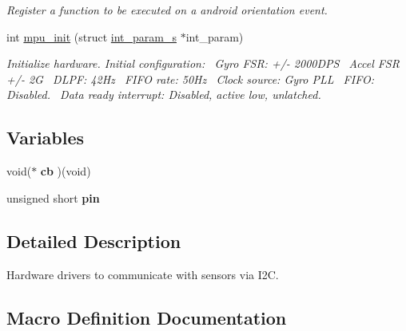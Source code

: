 \begin{DoxyCompactItemize}
\begin{DoxyCompactList}\small\item\em Register a function to be executed on a android orientation event. \end{DoxyCompactList}\item 
int \hyperlink{group___d_r_i_v_e_r_s_ga00895ac6d814fc0441118042d376aa0f}{mpu\+\_\+init} (struct \hyperlink{structint__param__s}{int\+\_\+param\+\_\+s} $\ast$int\+\_\+param)
\begin{DoxyCompactList}\small\item\em Initialize hardware. Initial configuration\+:~\newline
Gyro F\+SR\+: +/-\/ 2000\+D\+PS~\newline
Accel F\+SR +/-\/ 2G~\newline
D\+L\+PF\+: 42\+Hz~\newline
F\+I\+FO rate\+: 50\+Hz~\newline
Clock source\+: Gyro P\+LL~\newline
F\+I\+FO\+: Disabled.~\newline
Data ready interrupt\+: Disabled, active low, unlatched. \end{DoxyCompactList}\end{DoxyCompactItemize}
\subsection*{Variables}
\begin{DoxyCompactItemize}
\item 
void($\ast$ {\bfseries cb} )(void)\hypertarget{group___d_r_i_v_e_r_s_ga8a2c5b665902abd52db984f9f15a1e8b}{}\label{group___d_r_i_v_e_r_s_ga8a2c5b665902abd52db984f9f15a1e8b}

\item 
unsigned short {\bfseries pin}\hypertarget{group___d_r_i_v_e_r_s_ga503508a7ee88d8566cb3c882db1311b2}{}\label{group___d_r_i_v_e_r_s_ga503508a7ee88d8566cb3c882db1311b2}

\end{DoxyCompactItemize}


\subsection{Detailed Description}
Hardware drivers to communicate with sensors via I2C. 



\subsection{Macro Definition Documentation}

